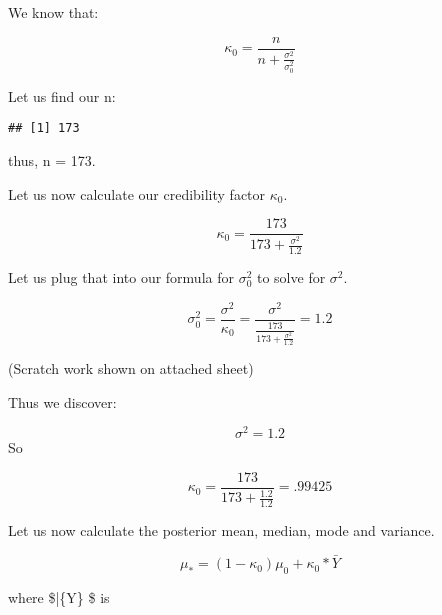 \documentclass[]{article}
\newenvironment{Shaded}{\begin{snugshade}}{\end{snugshade}}
\newcommand{\KeywordTok}[1]{\textcolor[rgb]{0.13,0.29,0.53}{\textbf{#1}}}
\newcommand{\StringTok}[1]{\textcolor[rgb]{0.31,0.60,0.02}{#1}}
\newcommand{\OperatorTok}[1]{\textcolor[rgb]{0.81,0.36,0.00}{\textbf{#1}}}
\newcommand{\NormalTok}[1]{#1}
\begin{document}
We know that:

\[ \kappa_0 = \frac{n}{n+\frac{\sigma^2}{\sigma^2_0}} \]

Let us find our n:

\begin{Shaded}
\end{Shaded}

\begin{verbatim}
## [1] 173
\end{verbatim}

thus, n = 173.

Let us now calculate our credibility factor \(\kappa_0\).

\[ \kappa_0 = \frac{173}{173 +\frac{\sigma^2}{1.2}} \]

Let us plug that into our formula for \(\sigma^2_0\) to solve for
\(\sigma^2\).

\begin{Shaded}
\end{Shaded}

\[ \sigma^2_0 = \frac{\sigma^2}{\kappa_0} = \frac{\sigma^2}{\frac{173}{173 +\frac{\sigma^2}{1.2}}} = 1.2 \]

(Scratch work shown on attached sheet)

Thus we discover:

\[ \sigma^2 = 1.2 \] So

\[ \kappa_0 = \frac{173}{173 +\frac{1.2}{1.2}} = .99425 \]

Let us now calculate the posterior mean, median, mode and variance.

\[ \mu_* = (1-\kappa_0)\mu_0 + \kappa_0*\bar{Y} \]

where \$\bar\{Y\} \$ is

\begin{Shaded}
\end{Shaded}
\end{document}
